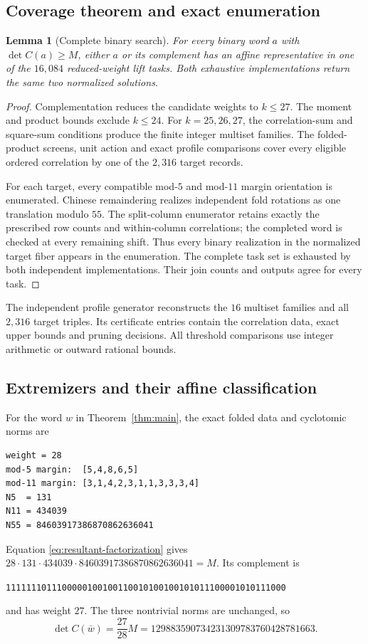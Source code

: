 \documentclass[11pt,a4paper]{article}
\newtheorem{lemma}{Lemma}
\theoremstyle{remark}
\begin{document}
\subsection{Coverage theorem and exact enumeration}

\begin{lemma}[Complete binary search]\label{lem:binary-complete}
For every binary word $a$ with $\det C(a)\geq M$, either $a$ or
its complement has an affine representative in one of the $16,084$
reduced-weight lift tasks.  Both exhaustive implementations return
the same two normalized solutions.
\end{lemma}
\begin{proof}
Complementation reduces the candidate weights to $k\le27$.
The moment and product bounds exclude $k\le24$.
For $k=25,26,27$, the correlation-sum and square-sum conditions
produce the finite integer multiset families.  The folded-product
screens, unit action and exact profile comparisons cover every
eligible ordered correlation by one of the $2,316$ target records.

For each target, every compatible mod-$5$ and mod-$11$ margin
orientation is enumerated.  Chinese remaindering realizes
independent fold rotations as one translation modulo $55$.
The split-column enumerator retains exactly the prescribed row
counts and within-column correlations; the completed word is
checked at every remaining shift.  Thus every binary realization
in the normalized target fiber appears in the enumeration.
The complete task set is exhausted by both independent implementations.
Their join counts and outputs agree for every task.
\end{proof}

The independent profile generator reconstructs the $16$ multiset
families and all $2,316$ target triples.  Its certificate entries
contain the correlation data, exact upper bounds and pruning decisions.
All threshold comparisons use integer arithmetic or outward rational bounds.



\subsection{Extremizers and their affine classification}


For the word $w$ in Theorem~\ref{thm:main}, the exact folded
data and cyclotomic norms are
\begin{lstlisting}
weight = 28
mod-5 margin:  [5,4,8,6,5]
mod-11 margin: [3,1,4,2,3,1,1,3,3,3,4]
N5  = 131
N11 = 434039
N55 = 84603917386870862636041
\end{lstlisting}
Equation \eqref{eq:resultant-factorization} gives
$28\cdot131\cdot434039\cdot84603917386870862636041=M$.
Its complement is
\begin{center}
\texttt{1111111011100000100100110010100100101011100001010111000}
\end{center}
and has weight $27$. The three nontrivial norms are unchanged, so
\[
 \det C(\bar w)=\frac{27}{28}M
  =129883590734231309783760428781663.
\]
\end{document}
